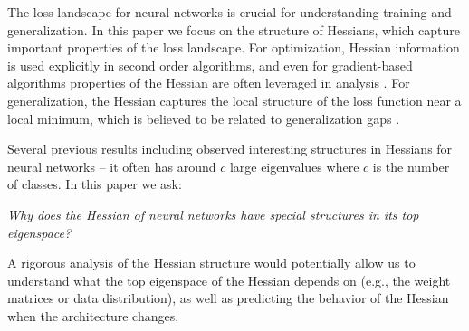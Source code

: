 \label{sec:intro}


The loss landscape for neural networks is crucial for understanding training and generalization. In this paper we focus on the structure of Hessians, which capture important properties of the loss landscape. For optimization, Hessian information is used explicitly in second order algorithms, and even for gradient-based algorithms properties of the Hessian are often leveraged in analysis \citep{sra2012optimization}. For generalization, the Hessian captures the local structure of the loss function near a local minimum, which is believed to be related to generalization gaps \citep{keskar2016large}. %

Several previous results including \citet{sagun2017empirical, papyan2018full} observed interesting structures in Hessians for neural networks \--- it often has around $c$ large eigenvalues where $c$ is the number of classes. In this paper we ask:
\begin{center}
    \emph{Why does the Hessian of neural networks have special structures in its top eigenspace?}
\end{center}

A rigorous analysis of the Hessian structure would potentially allow us to understand what the top eigenspace of the Hessian depends on (e.g., the weight matrices or data distribution), as well as predicting the behavior of the Hessian when the architecture changes. 

